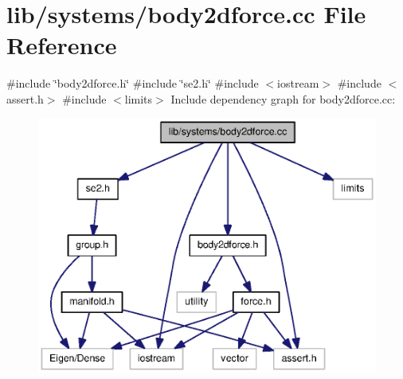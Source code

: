 \section{lib/systems/body2dforce.cc \-File \-Reference}
\label{body2dforce_8cc}
{\ttfamily \#include \char`\"{}body2dforce.\-h\char`\"{}}\*
{\ttfamily \#include \char`\"{}se2.\-h\char`\"{}}\*
{\ttfamily \#include $<$iostream$>$}\*
{\ttfamily \#include $<$assert.\-h$>$}\*
{\ttfamily \#include $<$limits$>$}\*
\-Include dependency graph for body2dforce.\-cc\-:\nopagebreak
\begin{figure}[H]
\begin{center}
\leavevmode
\includegraphics[width=350pt]{body2dforce_8cc__incl}
\end{center}
\end{figure}
